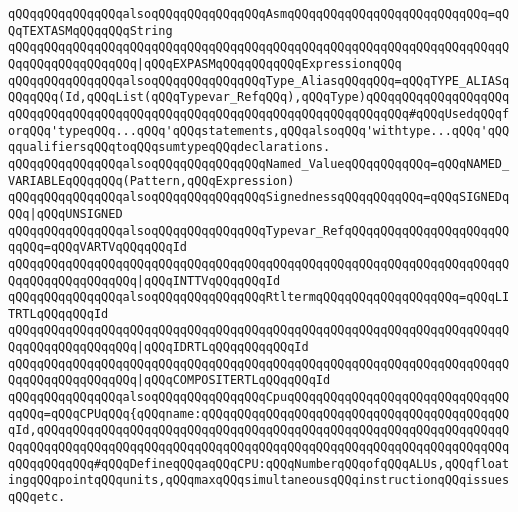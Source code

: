 \verb|qQQqqQQqqQQqqQQqalsoqQQqqQQqqQQqqQQqAsmqQQqqQQqqQQqqQQqqQQqqQQqqQQq=qQQqTEXTASMqQQqqQQqString|\newline
\verb|qQQqqQQqqQQqqQQqqQQqqQQqqQQqqQQqqQQqqQQqqQQqqQQqqQQqqQQqqQQqqQQqqQQqqQQqqQQqqQQqqQQqqQQq|\verb#|qQQqEXPASMqQQqqQQqqQQqExpressionqQQq#\newline
\newline
\verb|qQQqqQQqqQQqqQQqalsoqQQqqQQqqQQqqQQqType_AliasqQQqqQQq=qQQqTYPE_ALIASqQQqqQQq(Id,qQQqList(qQQqTypevar_RefqQQq),qQQqType)qQQqqQQqqQQqqQQqqQQqqQQqqQQqqQQqqQQqqQQqqQQqqQQqqQQqqQQqqQQqqQQqqQQqqQQqqQQq#qQQqUsedqQQqforqQQq'typeqQQq...qQQq'qQQqstatements,qQQqalsoqQQq'withtype...qQQq'qQQqqualifiersqQQqtoqQQqsumtypeqQQqdeclarations.|\newline
\newline
\verb|qQQqqQQqqQQqqQQqalsoqQQqqQQqqQQqqQQqNamed_ValueqQQqqQQqqQQq=qQQqNAMED_VARIABLEqQQqqQQq(Pattern,qQQqExpression)|\newline
\newline
\verb|qQQqqQQqqQQqqQQqalsoqQQqqQQqqQQqqQQqSignednessqQQqqQQqqQQq=qQQqSIGNEDqQQq|\verb#|qQQqUNSIGNED#\newline
\newline
\verb|qQQqqQQqqQQqqQQqalsoqQQqqQQqqQQqqQQqTypevar_RefqQQqqQQqqQQqqQQqqQQqqQQqqQQq=qQQqVARTVqQQqqQQqId|\newline
\verb|qQQqqQQqqQQqqQQqqQQqqQQqqQQqqQQqqQQqqQQqqQQqqQQqqQQqqQQqqQQqqQQqqQQqqQQqqQQqqQQqqQQqqQQq|\verb#|qQQqINTTVqQQqqQQqId#\newline
\newline
\verb|qQQqqQQqqQQqqQQqalsoqQQqqQQqqQQqqQQqRtltermqQQqqQQqqQQqqQQqqQQq=qQQqLITRTLqQQqqQQqId|\newline
\verb|qQQqqQQqqQQqqQQqqQQqqQQqqQQqqQQqqQQqqQQqqQQqqQQqqQQqqQQqqQQqqQQqqQQqqQQqqQQqqQQqqQQqqQQq|\verb#|qQQqIDRTLqQQqqQQqqQQqId#\newline
\verb|qQQqqQQqqQQqqQQqqQQqqQQqqQQqqQQqqQQqqQQqqQQqqQQqqQQqqQQqqQQqqQQqqQQqqQQqqQQqqQQqqQQqqQQq|\verb#|qQQqCOMPOSITERTLqQQqqQQqId#\newline
\newline
\verb|qQQqqQQqqQQqqQQqalsoqQQqqQQqqQQqqQQqCpuqQQqqQQqqQQqqQQqqQQqqQQqqQQqqQQqqQQq=qQQqCPUqQQq{qQQqname:qQQqqQQqqQQqqQQqqQQqqQQqqQQqqQQqqQQqqQQqqQQqId,qQQqqQQqqQQqqQQqqQQqqQQqqQQqqQQqqQQqqQQqqQQqqQQqqQQqqQQqqQQqqQQqqQQqqQQqqQQqqQQqqQQqqQQqqQQqqQQqqQQqqQQqqQQqqQQqqQQqqQQqqQQqqQQqqQQqqQQqqQQqqQQqqQQq#qQQqDefineqQQqaqQQqCPU:qQQqNumberqQQqofqQQqALUs,qQQqfloatingqQQqpointqQQqunits,qQQqmaxqQQqsimultaneousqQQqinstructionqQQqissuesqQQqetc.|\newline

